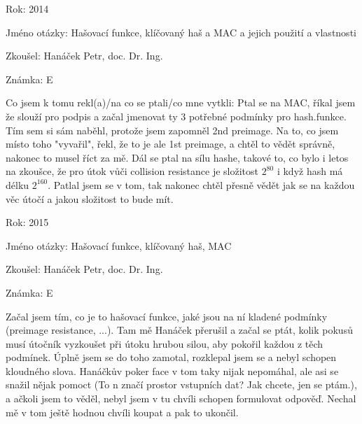 \begin{compactitem}
    \item Rok: 2014
    \item Jméno otázky: Hašovací funkce, klíčovaný haš a MAC a jejich použití a vlastnosti
    \item Zkoušel: Hanáček Petr, doc. Dr. Ing.
    \item Známka: E
    \item Co jsem k tomu rekl(a)/na co se ptali/co mne vytkli: Ptal se na MAC, říkal jsem že slouží pro podpis a začal jmenovat ty 3 potřebné podmínky pro hash.funkce. Tím sem si sám naběhl, protože jsem zapomněl 2nd preimage. Na to, co jsem místo toho "vyvařil", řekl, že to je ale 1st preimage, a chtěl to vědět správně, nakonec to musel říct za mě. Dál se ptal na sílu hashe, takové to, co bylo i letos na zkoušce, že pro útok vůči collision resistance je složitost $2^{80}$ i když hash má délku $2^{160}$. Patlal jsem se v tom, tak nakonec chtěl přesně vědět jak se na každou věc útočí a jakou složitost to bude mít.
\end{compactitem}

\begin{compactitem}
    \item Rok: 2015
    \item Jméno otázky: Hašovací funkce, klíčovaný haš, MAC
    \item Zkoušel: Hanáček Petr, doc. Dr. Ing.
    \item Známka: E
    \item Začal jsem tím, co je to hašovací funkce, jaké jsou na ní kladené podmínky (preimage resistance, ...). Tam mě Hanáček přerušil a začal se ptát, kolik pokusů musí útočník vyzkoušet při útoku hrubou silou, aby pokořil každou z těch podmínek. Úplně jsem se do toho zamotal, rozklepal jsem se a nebyl schopen kloudného slova. Hanáčkův poker face v tom taky nijak nepomáhal, ale asi se snažil nějak pomoct (To n značí prostor vstupních dat? Jak chcete, jen se ptám.), a ačkoli jsem to věděl, nebyl jsem v tu chvíli schopen formulovat odpověď. Nechal mě v tom ještě hodnou chvíli koupat a pak to ukončil.
\end{compactitem}

